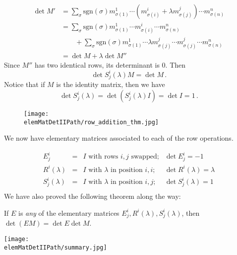 \begin{align*}
\det M' & = \sum_{\sigma} \text{sgn}(\sigma) m^1_{\sigma(1)}\cdots (m^i_{\sigma(i)}+ \lambda m^j_{\sigma(j)}) \cdots m^n_{\sigma(n)} \\
& = \sum_{\sigma} \text{sgn}(\sigma) m^1_{\sigma(1)}\cdots m^i_{\sigma(i)} \cdots m^n_{\sigma(n)} \\
&   \qquad + \sum_{\sigma} \text{sgn}(\sigma) m^1_{\sigma(1)}\cdots \lambda m^j_{\sigma(j)} \cdots m^j_{\sigma(j)} \cdots m^n_{\sigma(n)} \\
& = \det M + \lambda \det M''
\end{align*}
Since $M''$ has two identical rows, its determinant is $0$.  Then \[\det S^i_j(\lambda)M = \det M\, .\]
Notice that if $M$ is the identity matrix, then we have \[\det S^i_j(\lambda) = \det (S^i_j(\lambda)I) = \det I = 1\, .\]

\begin{figure}
\begin{center}
\texttt{[image: \\elemMatDetIIPath/row\_addition\_thm.jpg]}
\end{center}
\end{figure}

We now have elementary matrices associated to each of the row operations.

\[
\begin{array}{cccc}
E^i_j &=& I \text{ with rows $i,j$ swapped;} &\det E^i_j=-1 \\[3mm]
R^i(\lambda) &=& I \text{ with $\lambda$ in position $i,i$;} 
	&\det R^i(\lambda)=\lambda \\[3mm]
S^i_j(\lambda) &=& I \text{ with $\lambda$ in position $i,j$;} 
	&\det S^i_j(\lambda)=1 \\[3mm]
\end{array}
\]
We have also proved the following theorem along the way:

\begin{theorem}
If $E$ is \emph{any} of the elementary matrices $E^i_j, R^i(\lambda), S^i_j(\lambda)$, then $\det(EM)=\det E \det M$.
\end{theorem}



\begin{center}
\hspace{3mm}\texttt{[image: \\elemMatDetIIPath/summary.jpg]}
\end{center}


